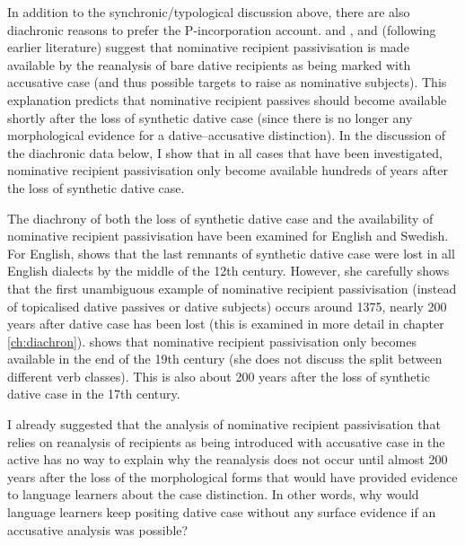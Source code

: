 In addition to the synchronic/typological discussion above, there are also diachronic reasons to prefer the P-incorporation account. \cite{Falk.1997} and \cite{Allen.1999}, and \cite{Platzack.2005} (following earlier literature) suggest that nominative recipient passivisation is made available by the reanalysis of bare dative recipients as being marked with accusative case (and thus possible targets to raise as nominative subjects). This explanation predicts that nominative recipient passives should become available shortly after the loss of synthetic dative case (since there is no longer any morphological evidence for a dative--accusative distinction). In the discussion of the diachronic data below, I show that in all cases that have been investigated, nominative recipient passivisation only become available hundreds of years after the loss of synthetic dative case.

The diachrony of both the loss of synthetic dative case and the availability of nominative recipient passivisation have been examined for English and Swedish. For English, \cite{Allen.1999} shows that the last remnants of synthetic dative case were lost in all English dialects by the middle of the 12th century. However, she carefully shows that the first unambiguous example of nominative recipient passivisation (instead of topicalised dative passives or dative subjects) occurs around 1375, nearly 200 years after dative case has been lost (this is examined in more detail in chapter \ref{ch:diachron}). \cite{Falk.1997} shows that nominative recipient passivisation only becomes available in the end of the 19th century (she does not discuss the split between different verb classes). This is also about 200 years after the loss of synthetic dative case in the 17th century. 

I already suggested that the analysis of nominative recipient passivisation that relies on reanalysis of recipients as being introduced with accusative case in the active has no way to explain why the reanalysis does not occur until almost 200 years after the loss of the morphological forms that would have provided evidence to language learners about the case distinction. In other words, why would language learners keep positing dative case without any surface evidence if an accusative analysis was possible? 

